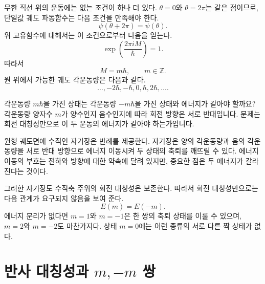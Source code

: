 무한 직선 위의 운동에는 없는 조건이 하나 더 있다. \(\theta=0\)와 \(\theta=2\pi\)는 같은 점이므로, 단일값 궤도 파동함수는 다음 조건을 만족해야 한다.
\begin{equation}
\psi(\theta+2\pi)=\psi(\theta).
\end{equation}
위 고유함수에 대해서는 이 조건으로부터 다음을 얻는다.
\begin{equation}
\exp\left(\frac{2\pi iM}{\hbar}\right)=1.
\end{equation}
따라서
\begin{equation}
M=m\hbar,
\qquad
m\in\mathbb Z.
\end{equation}
원 위에서 가능한 궤도 각운동량은 다음과 같다.
\begin{equation}
\ldots,-2\hbar,-\hbar,0,\hbar,2\hbar,\ldots.
\end{equation}

각운동량 \(m\hbar\)을 가진 상태는 각운동량 \(-m\hbar\)을 가진 상태와 에너지가 같아야 할까요? 각운동량 양자수 \(m\)가 양수인지 음수인지에 따라 회전 방향은 서로 반대입니다. 문제는 회전 대칭성만으로 이 두 운동의 에너지가 같아야 하는가입니다.

\begin{classroomqa}
\end{classroomqa}

원형 궤도면에 수직인 자기장은 반례를 제공한다. 자기장은 양의 각운동량과 음의 각운동량을 서로 반대 방향으로 에너지 이동시켜 두 상태의 축퇴를 깨뜨릴 수 있다. 에너지 이동의 부호는 전하와 방향에 대한 약속에 달려 있지만, 중요한 점은 두 에너지가 갈라진다는 것이다.

그러한 자기장도 수직축 주위의 회전 대칭성은 보존한다. 따라서 회전 대칭성만으로는 다음 관계가 요구되지 않음을 보여 준다.
\begin{equation}
E(m)=E(-m).
\end{equation}
에너지 분리가 없다면 \(m=1\)와 \(m=-1\)은 한 쌍의 축퇴 상태를 이룰 수 있으며, \(m=2\)와 \(m=-2\)도 마찬가지다. 상태 \(m=0\)에는 이런 종류의 서로 다른 짝 상태가 없다.

\section{반사 대칭성과 \texorpdfstring{\(m,-m\)}{m, -m} 쌍}

